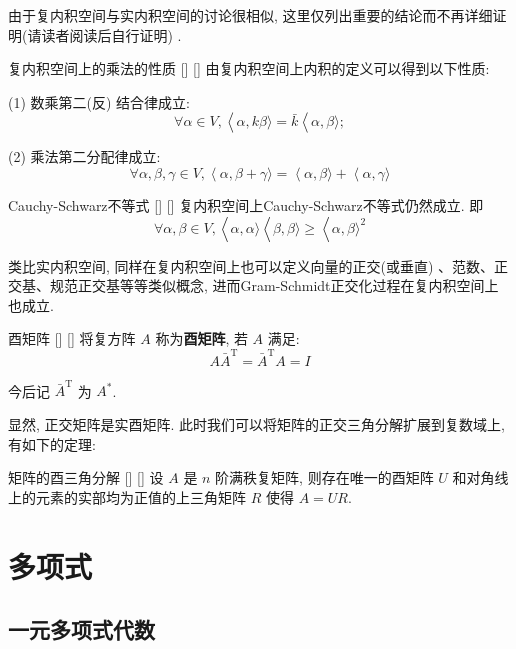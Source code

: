 \documentclass[UTF8]{ctexart}
\DeclareMathOperator{\0}{\mathbf{0}}
\DeclareMathOperator{\<}{\langle}
\renewcommand{\>}{\rangle}
\begin{document}
		由于复内积空间与实内积空间的讨论很相似, 这里仅列出重要的结论而不再详细证明(请读者阅读后自行证明) . 

		\begin{ppt}
			[]
			{复内积空间上的乘法的性质}
			[]
			[]
			由复内积空间上内积的定义可以得到以下性质: 

			(1) 数乘第二(反) 结合律成立: \[\forall \alpha\in V,\<\alpha,k\beta\>=\bar{k}\<\alpha,\beta\>;\]

			(2) 乘法第二分配律成立: \[\forall\alpha,\beta,\gamma\in V, \<\alpha,\beta+\gamma\>=\<\alpha,\beta\>+\<\alpha,\gamma\>\]
		\end{ppt}

		\begin{thm}
			[]
			{Cauchy-Schwarz不等式}
			[]
			[]
			复内积空间上Cauchy-Schwarz不等式仍然成立. 即\[\forall\alpha, \beta\in V, \<\alpha,\alpha\>\<\beta,\beta\>\geq\<\alpha,\beta\>^2\]
		\end{thm}

		类比实内积空间, 同样在复内积空间上也可以定义向量的正交(或垂直) 、范数、正交基、规范正交基等等类似概念, 进而Gram-Schmidt正交化过程在复内积空间上也成立. 

		\begin{dfn}
			[]
			{酉矩阵}
			[]
			[]
			将复方阵 \(A\) 称为\textbf{酉矩阵}, 若 \(A\) 满足: 
			\[A\bar{A}^\mathrm{T}=\bar{A}^\mathrm{T}A=I\]

			今后记  \(\bar{A}^\mathrm{T}\)  为  \(A^*\).
		\end{dfn}

		显然, 正交矩阵是实酉矩阵. 此时我们可以将矩阵的正交三角分解扩展到复数域上, 有如下的定理: 

		\begin{thm}
			[]
			{矩阵的酉三角分解}
			[]
			[]
			设 \(A\) 是 \(n\) 阶满秩复矩阵, 则存在唯一的酉矩阵 \(U\) 和对角线上的元素的实部均为正值的上三角矩阵 \(R\) 使得 \(A=UR\).
		\end{thm}

\section{多项式}
	
	\subsection{一元多项式代数}
		
\end{document}
